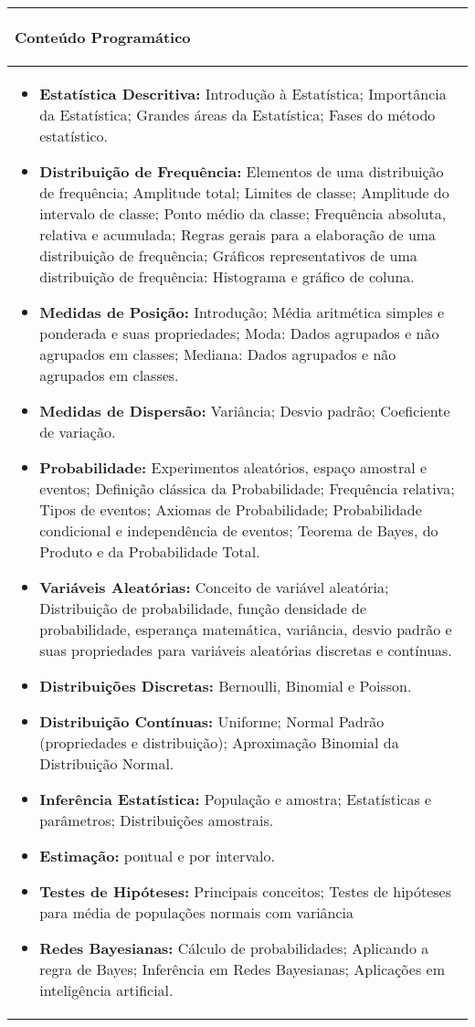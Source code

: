 \hspace{1cm}
\begin{table}[h]
\centering
\begin{small} 
\setlength{\tabcolsep}{3pt} 
\begin{tabular}{|p{15cm}|}\hline

\begin{center}\textbf{Conteúdo Programático}\end{center}\\ \hline
\begin{itemize}
 \item \textbf{Estatística Descritiva:} Introdução à Estatística; Importância da Estatística; Grandes áreas da Estatística; Fases do método estatístico.
 \item \textbf{Distribuição de Frequência:} Elementos de uma distribuição de frequência; Amplitude total; Limites de classe; Amplitude do intervalo de classe; Ponto médio da classe; Frequência absoluta, relativa e acumulada; Regras gerais para a elaboração de uma distribuição de frequência; Gráficos representativos de uma distribuição de frequência: Histograma e gráfico de coluna.
 \item \textbf{Medidas de Posição:} Introdução; Média aritmética simples e ponderada e suas propriedades; Moda: Dados agrupados e não  agrupados em classes; Mediana: Dados agrupados e não agrupados em classes.
 \item \textbf{Medidas de Dispersão:} Variância; Desvio padrão; Coeficiente de variação.
 \item \textbf{Probabilidade:} Experimentos aleatórios, espaço amostral e eventos; Definição clássica da Probabilidade; Frequência relativa; Tipos de eventos; Axiomas de Probabilidade; Probabilidade condicional e independência de eventos; Teorema de Bayes, do Produto e da Probabilidade Total.
 \item \textbf{Variáveis Aleatórias:} Conceito de variável aleatória; Distribuição de probabilidade, função densidade de probabilidade, esperança matemática, variância, desvio padrão e suas propriedades para variáveis aleatórias discretas e contínuas.
 \item \textbf{Distribuições Discretas:} Bernoulli, Binomial e Poisson.
 \item \textbf{Distribuição Contínuas:} Uniforme; Normal Padrão (propriedades e distribuição); Aproximação Binomial da Distribuição Normal.
 \item \textbf{Inferência Estatística:} População e amostra; Estatísticas e parâmetros; Distribuições amostrais.
 \item \textbf{Estimação:} pontual e por intervalo.
 \item \textbf{Testes de Hipóteses:} Principais conceitos; Testes de hipóteses para média de populações normais com variância 
 \item \textbf{Redes Bayesianas:} Cálculo de probabilidades; Aplicando a regra de Bayes; Inferência em Redes Bayesianas; Aplicações em inteligência artificial.
\end{itemize}
 \\ \hline


\end{tabular}
\end{small}
\end{table}

